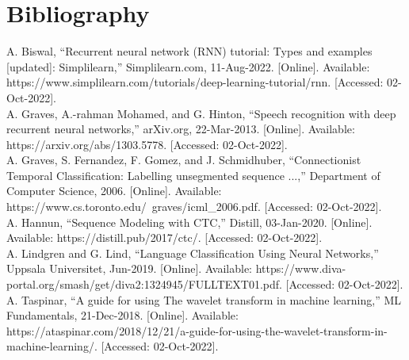 
\chapter{Bibliography} %

\label{Bibliography} %


\small
\noindent
A. Biswal, “Recurrent neural network (RNN) tutorial: Types and examples [updated]: Simplilearn,” Simplilearn.com, 11-Aug-2022. [Online]. \newline Available: https://www.simplilearn.com/tutorials/deep-learning-tutorial/rnn. [Accessed: 02-Oct-2022]. \\
\newline
A. Graves, A.-rahman Mohamed, and G. Hinton, “Speech recognition with deep recurrent neural networks,” arXiv.org, 22-Mar-2013. [Online]. \newline Available: https://arxiv.org/abs/1303.5778. [Accessed: 02-Oct-2022]. \\
\newline
A. Graves, S. Fernandez, F. Gomez, and J. Schmidhuber, “Connectionist Temporal Classiﬁcation: Labelling unsegmented sequence ...,” Department of Computer Science, 2006. [Online]. \newline Available: https://www.cs.toronto.edu/~graves/icml\_2006.pdf. [Accessed: 02-Oct-2022]. \\
\newline
A. Hannun, “Sequence Modeling with CTC,” Distill, 03-Jan-2020. [Online]. \newline Available: https://distill.pub/2017/ctc/. [Accessed: 02-Oct-2022]. \\
\newline
A. Lindgren and G. Lind, “Language Classification Using Neural Networks,” Uppsala Universitet, Jun-2019. [Online]. \newline Available: https://www.diva-portal.org/smash/get/diva2:1324945/FULLTEXT01.pdf. [Accessed: 02-Oct-2022]. \\
\newline
A. Taspinar, “A guide for using The wavelet transform in machine learning,” ML Fundamentals, 21-Dec-2018. [Online]. \newline Available: https://ataspinar.com/2018/12/21/a-guide-for-using-the-wavelet-transform-in-machine-learning/. [Accessed: 02-Oct-2022]. \\
